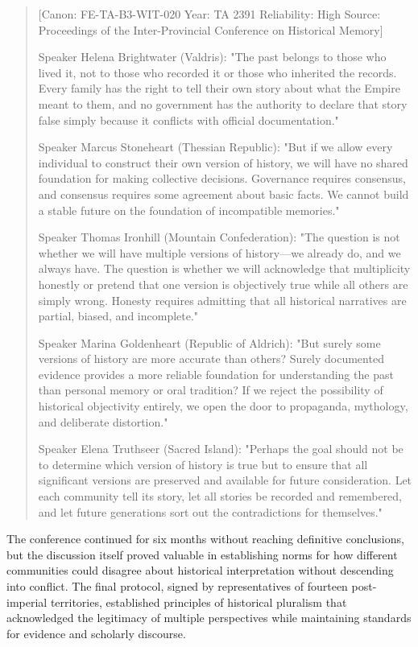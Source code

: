 \begin{quote}
{[}Canon: FE-TA-B3-WIT-020 \textbar{} Year: TA 2391 \textbar{}
Reliability: High \textbar{} Source: Proceedings of the Inter-Provincial
Conference on Historical Memory{]}

Speaker Helena Brightwater (Valdris): "The past belongs to those who
lived it, not to those who recorded it or those who inherited the
records. Every family has the right to tell their own story about what
the Empire meant to them, and no government has the authority to declare
that story false simply because it conflicts with official
documentation."

Speaker Marcus Stoneheart (Thessian Republic): "But if we allow every
individual to construct their own version of history, we will have no
shared foundation for making collective decisions. Governance requires
consensus, and consensus requires some agreement about basic facts. We
cannot build a stable future on the foundation of incompatible
memories."

Speaker Thomas Ironhill (Mountain Confederation): "The question is not
whether we will have multiple versions of history---we already do, and
we always have. The question is whether we will acknowledge that
multiplicity honestly or pretend that one version is objectively true
while all others are simply wrong. Honesty requires admitting that all
historical narratives are partial, biased, and incomplete."

Speaker Marina Goldenheart (Republic of Aldrich): "But surely some
versions of history are more accurate than others? Surely documented
evidence provides a more reliable foundation for understanding the past
than personal memory or oral tradition? If we reject the possibility of
historical objectivity entirely, we open the door to propaganda,
mythology, and deliberate distortion."

Speaker Elena Truthseer (Sacred Island): "Perhaps the goal should not be
to determine which version of history is
\textquotesingle true\textquotesingle{} but to ensure that all
significant versions are preserved and available for future
consideration. Let each community tell its story, let all stories be
recorded and remembered, and let future generations sort out the
contradictions for themselves."
\end{quote}

The conference continued for six months without reaching definitive
conclusions, but the discussion itself proved valuable in establishing
norms for how different communities could disagree about historical
interpretation without descending into conflict. The final protocol,
signed by representatives of fourteen post-imperial territories,
established principles of historical pluralism that acknowledged the
legitimacy of multiple perspectives while maintaining standards for
evidence and scholarly discourse.

